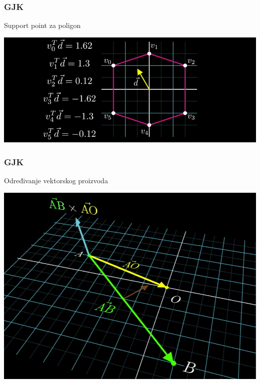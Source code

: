 \documentclass{beamer}
\begin{document}
\begin{frame}
	\frametitle{GJK}
	\Large
	Support point za poligon
	\begin{center}
		\includegraphics[scale=0.33]{./images/gjk4.png}
	\end{center}
\end{frame}

\begin{frame}
	\frametitle{GJK}
	\Large
	Određivanje vektorskog proizvoda
	\begin{center}
		\includegraphics[scale=0.3]{./images/gjk5.png}
	\end{center}
\end{frame}
\end{document}

